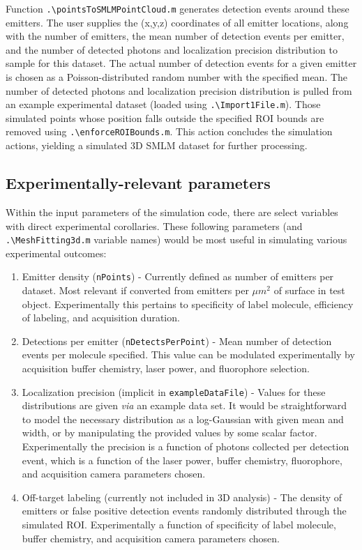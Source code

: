 \documentclass[10pt,a4paper]{article}
\begin{document}
Function \texttt{.\textbackslash pointsToSMLMPointCloud.m} generates detection events around these emitters.  The user supplies the (x,y,z) coordinates of all emitter locations, along with the number of emitters, the mean number of detection events per emitter, and the number of detected photons and localization precision distribution to sample for this dataset.  The actual number of detection events for a given emitter is chosen as a Poisson-distributed random number with the specified mean.  The number of detected photons and localization precision distribution is pulled from an example experimental dataset (loaded using \texttt{.\textbackslash Import1File.m}).  Those simulated points whose position falls outside the specified ROI bounds are removed using \texttt{.\textbackslash enforceROIBounds.m}.  This action concludes the simulation actions, yielding a simulated 3D SMLM dataset for further processing.

\subsection{Experimentally-relevant parameters}

Within the input parameters of the simulation code, there are select variables with direct experimental corollaries. These following parameters (and \texttt{.\textbackslash MeshFitting3d.m} variable names) would be most useful in simulating various experimental outcomes:

\begin{enumerate}
	\item Emitter density (\texttt{nPoints}) - Currently defined as number of emitters per dataset.  Most relevant if converted from emitters per $\mu m^{2}$ of surface in test object.  Experimentally this pertains to specificity of label molecule, efficiency of labeling, and acquisition duration. 
	\item Detections per emitter (\texttt{nDetectsPerPoint}) - Mean number of detection events per molecule specified.  This value can be modulated experimentally by acquisition buffer chemistry, laser power, and fluorophore selection.
	\item Localization precision (implicit in \texttt{exampleDataFile}) - Values for these distributions are given \textit{via} an example data set.  It would be straightforward to model the necessary distribution as a log-Gaussian with given mean and width, or by manipulating the provided values by some scalar factor.  Experimentally the precision is a function of photons collected per detection event, which is a function of the laser power, buffer chemistry, fluorophore, and acquisition camera parameters chosen. 
	\item Off-target labeling (currently not included in 3D analysis) - The density of emitters or false positive detection events randomly distributed through the simulated ROI.  Experimentally a function of specificity of label molecule, buffer chemistry, and acquisition camera parameters chosen. 
\end{enumerate}
\end{document}
